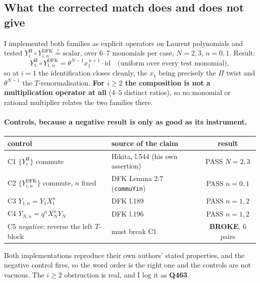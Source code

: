 \documentclass[11pt]{article}
\theoremstyle{remark}
\begin{document}
\subsection{What the corrected match does and does not give}
I implemented both families as explicit operators on Laurent polynomials and tested
$Y^{\mathrm H}_i\circ Y^{\mathrm{DFK}}_{i,n}\overset{?}{=}\text{scalar}$, over $6$--$7$ monomials
per case, $N=2,3$, $n=0,1$. Result:
\[ Y^{\mathrm H}_1\circ Y^{\mathrm{DFK}}_{1,n}=\theta^{N-1}x_1^{\,n+1}\cdot\mathrm{id}
\quad\text{(uniform over every test monomial)}, \]
so at $i=1$ the identification closes cleanly, the $x_1$ being precisely the $\Pi$ twist and
$\theta^{N-1}$ the $T$-renormalisation. \textbf{For $i\ge2$ the composition is not a
multiplication operator at all} ($4$--$5$ distinct ratios), so no monomial or rational
multiplier relates the two families there.

\paragraph{Controls, because a negative result is only as good as its instrument.}
\begin{center}\small
\begin{tabular}{llc}
\toprule
control & source of the claim & result \\
\midrule
C1 $\{Y^{\mathrm H}_i\}$ commute & Hikita, l.544 (his own assertion) & PASS $N=2,3$\\
C2 $\{Y^{\mathrm{DFK}}_{i,n}\}$ commute, $n$ fixed & DFK Lemma 2.7 (\texttt{commuYin}) & PASS $n=0,1$\\
C3 $Y_{1,n}=Y_1X_1^n$ & DFK l.189 & PASS $n=1,2$\\
C4 $Y_{N,n}=q^nX_N^nY_N$ & DFK l.196 & PASS $n=1,2$\\
C5 \emph{negative}: reverse the left $T$-block & must break C1 & \textbf{BROKE}, 6 pairs\\
\bottomrule
\end{tabular}
\end{center}
Both implementations reproduce their own authors' stated properties, and the negative control
fires, so the word order is the right one and the controls are not vacuous. The $i\ge2$
obstruction is real, and I log it as \textbf{Q463}.
\end{document}

